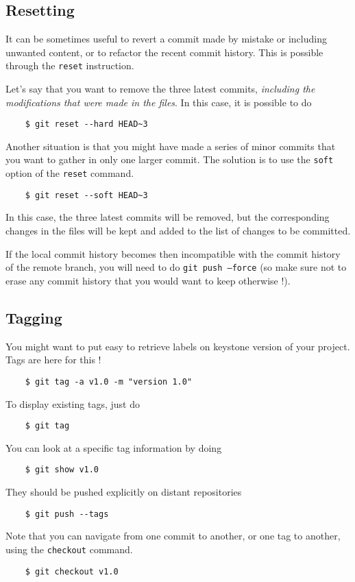\documentclass{article}
\begin{document}
\subsection{Resetting}

It can be sometimes useful to revert a commit made by mistake or including unwanted content, or to refactor the recent commit history. This is possible through the \texttt{reset} instruction. 

Let's say that you want to remove the three latest commits, \textit{including the modifications that were made in the files}. In this case, it is possible to do 

\begin{lstlisting}
    $ git reset --hard HEAD~3
\end{lstlisting}

Another situation is that you might have made a series of minor commits that you want to gather in only one larger commit. The solution is to use the \texttt{soft} option of the \texttt{reset} command.

\begin{lstlisting}
    $ git reset --soft HEAD~3
\end{lstlisting}

In this case, the three latest commits will be removed, but the corresponding changes in the files will be kept and added to the list of changes to be committed. 

If the local commit history becomes then incompatible with the commit history of the remote branch, you will need to do \texttt{git push --force} (so make sure not to erase any commit history that you would want to keep otherwise !). 

\subsection{Tagging}

You might want to put easy to retrieve labels on keystone version of your project. Tags are here for this ! 
\begin{lstlisting}
    $ git tag -a v1.0 -m "version 1.0"
\end{lstlisting}
To display existing tags, just do
\begin{lstlisting}
    $ git tag 
\end{lstlisting}
You can look at a specific tag information by doing
\begin{lstlisting}
    $ git show v1.0
\end{lstlisting}
They should be pushed explicitly on distant repositories 
\begin{lstlisting}
    $ git push --tags
\end{lstlisting}
Note that you can navigate from one commit to another, or one tag to another, using the \texttt{checkout} command.
\begin{lstlisting}
    $ git checkout v1.0
\end{lstlisting}
\end{document}
